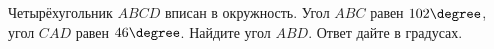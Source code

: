 \begin{ex}
	\begin{condition}
		Четырёхугольник \( ABCD \)  вписан в окружность. Угол \( ABC \)  равен \( 102\degree\), угол \( CAD \)  равен \( 46\degree \). Найдите угол \( ABD \). Ответ дайте в градусах.
	\end{condition}
\end{ex}